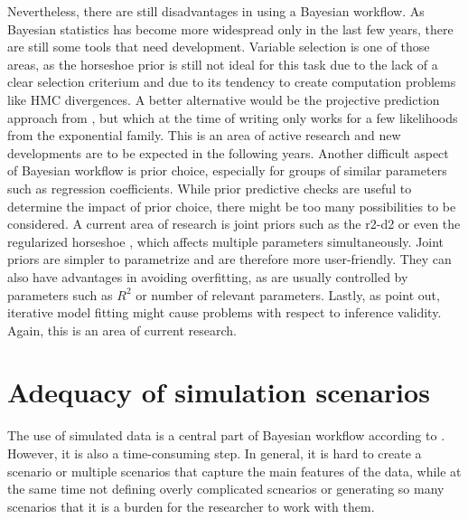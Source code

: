 Nevertheless, there are still disadvantages in using a Bayesian workflow.
As Bayesian statistics has become more widespread only in the last few years, there are still some tools that need development.
Variable selection is one of those areas, as the horseshoe prior is still not ideal for this task due to the lack of a clear selection criterium and due to its tendency to create computation problems like HMC divergences.
A better alternative would be the projective prediction approach from \cite{piironen_projective_2020}, but which at the time of writing only works for a few likelihoods from the exponential family.
This is an area of active research and new developments are to be expected in the following years.
Another difficult aspect of Bayesian workflow is prior choice, especially for groups of similar parameters such as regression coefficients.
While prior predictive checks are useful to determine the impact of prior choice, there might be too many possibilities to be considered.
A current area of research is joint priors such as the r2-d2 \citep{zhang_bayesian_2020} or even the regularized horseshoe \citep{piironen_sparsity_2017}, which affects multiple parameters simultaneously.
Joint priors are simpler to parametrize and are therefore more user-friendly.
They can also have advantages in avoiding overfitting, as are usually controlled by parameters such as $R^2$ or number of relevant parameters.
Lastly, as \cite{gelman_bayesian_2020} point out, iterative model fitting might cause problems with respect to inference validity.
Again, this is an area of current research.

\section{Adequacy of simulation scenarios}
\label{ch:adequacy_simulations}

The use of simulated data is a central part of Bayesian workflow according to \cite{gelman_bayesian_2020}.
However, it is also a time-consuming step.
In general, it is hard to create a scenario or multiple scenarios that capture the main features of the data, while at the same time not defining overly complicated scnearios or generating so many scenarios that it is a burden for the researcher to work with them.

